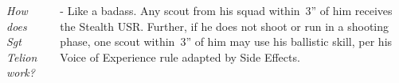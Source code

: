 \documentclass{40k}
\begin{document}
\begin{columns}
%

\smallskip\noindent\emph{How does Sgt Telion work?}

- Like a badass.  Any scout from his squad within~3'' of him receives
the Stealth USR.  Further, if he does not shoot or run in a shooting
phase, one scout within~3'' of him may use his ballistic skill, per
his Voice of Experience rule adapted by Side Effects.

\end{columns}
\end{document}
